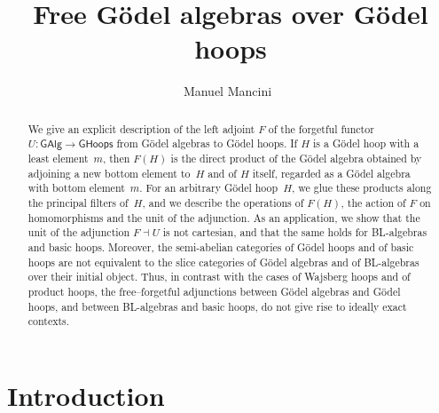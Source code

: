 \documentclass[reqno,a4paper]{amsart}
\theoremstyle{plain}
\theoremstyle{definition}
\theoremstyle{remark}
\numberwithin{equation}{section}
\newcommand{\GHoops}{\ensuremath{\mathsf{GHoops}}}
\newcommand{\GAlg}{\ensuremath{\mathsf{GAlg}}}
\begin{document}
\title[Free G\"odel algebras over G\"odel hoops]{Free G\"odel algebras over G\"odel hoops}

\author[M.~Mancini]{Manuel Mancini~}


\address{Institut de Recherche en Mathématique et Physique, Université catholique de Louvain, chemin du cyclotron 2 bte L7.01.02, B--1348 Louvain-la-Neuve, Belgium.}
\address{Dipartimento di Matematica e Informatica, Università degli Studi di Palermo, Via Archirafi 34, 90123 Palermo, Italy.}

\date{}

\begin{abstract}
We give an explicit description of the left adjoint $F$ of the forgetful functor $U\colon\GAlg\to\GHoops$ from G\"odel algebras to G\"odel hoops. If $H$ is a G\"odel hoop with a least element~$m$, then $F(H)$ is the direct product of the G\"odel algebra obtained by adjoining a new bottom element to~$H$ and of $H$ itself, regarded as a G\"odel algebra with bottom element~$m$. For an arbitrary G\"odel hoop~$H$, we glue these products along the principal filters of~$H$, and we describe the operations of $F(H)$, the action of $F$ on homomorphisms and the unit of the adjunction. As an application, we show that the unit of the adjunction $F\dashv U$ is not cartesian, and that the same holds for BL-algebras and basic hoops. Moreover, the semi-abelian categories of G\"odel hoops and of basic hoops are not equivalent to the slice categories of G\"odel algebras and of BL-algebras over their initial object. Thus, in contrast with the cases of Wajsberg hoops and of product hoops, the free--forgetful adjunctions between G\"odel algebras and G\"odel hoops, and between BL-algebras and basic hoops, do not give rise to ideally exact contexts.
\end{abstract}


\maketitle

\section{Introduction}\label{SecIntro}
\end{document}
